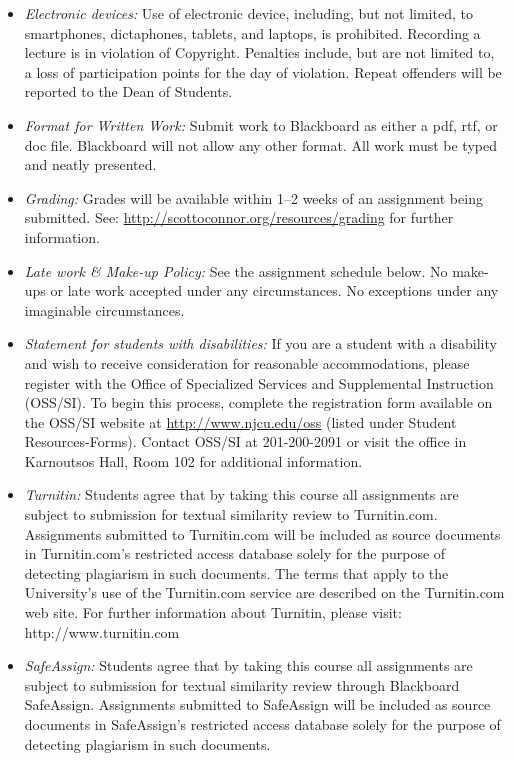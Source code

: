 \documentclass[article,oneside]{memoir}
\begin{document}
\begin{itemize}
\item \textit{Electronic devices:} Use of electronic device, including, but not limited, to smartphones, dictaphones, tablets, and laptops, is prohibited. Recording a lecture is in violation of Copyright. Penalties include, but are not limited to, a loss of participation points for the day of violation. Repeat offenders will be reported to the Dean of Students.

\item \textit{Format for Written Work:} Submit work to Blackboard as either a pdf, rtf, or doc file. Blackboard will not allow any other format. All work must be typed and neatly presented. 


\item \textit{Grading:} Grades will be available within 1--2 weeks of an assignment being submitted. See: \href{http://scottoconnor.org/resources/grading}{http://scottoconnor.org/resources/grading} for further information.


\item \textit{Late work \& Make-up Policy:} See the assignment schedule below. No make-ups or late work accepted under any circumstances. No exceptions under any imaginable circumstances.

\item \textit{Statement for students with disabilities:} If you are a student
with a disability and wish to receive consideration for reasonable
accommodations, please register with the Office of Specialized Services
and Supplemental Instruction (OSS/SI). To begin this process, complete
the registration form available on the OSS/SI website at
\href{http://www.njcu.edu/oss}{http://www.njcu.edu/oss}
(listed under Student Resources-Forms). Contact OSS/SI at 201-200-2091
or visit the office in Karnoutsos Hall, Room 102 for additional
information.

\item \textit{Turnitin:} Students agree that by taking this course all assignments are subject to submission for textual similarity review to Turnitin.com. Assignments submitted to Turnitin.com will be included as source documents in Turnitin.com's restricted access database solely for the purpose of detecting plagiarism in such documents.  The terms that apply to the University’s use of the Turnitin.com service are described on the Turnitin.com web site.  For further information about Turnitin, please visit: http://www.turnitin.com 

\item \textit{SafeAssign:} Students agree that by taking this course all assignments are subject to submission for textual similarity review through Blackboard SafeAssign. Assignments submitted to SafeAssign will be included as source documents in SafeAssign's restricted access database solely for the purpose of detecting plagiarism in such documents.  


\end{itemize}
\end{document}

